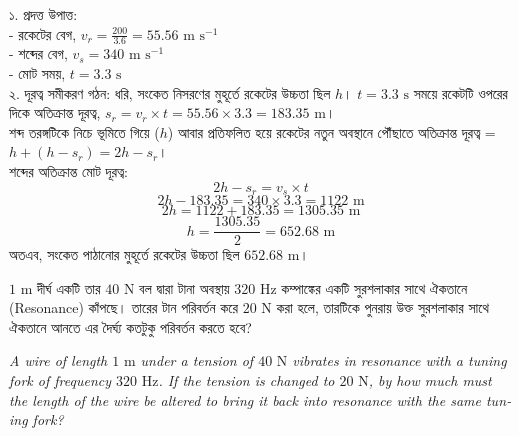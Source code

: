 \documentclass[12pt, a4paper]{article}
\begin{document}
\vspace{1em}
\begin{tcolorbox}[solutionbox={সমাধান (Solution)}]
\noindent
১. প্রদত্ত উপাত্ত: \\
- রকেটের বেগ, $v_r = \frac{200}{3.6} = 55.56\text{ m s}^{-1}$ \\
- শব্দের বেগ, $v_s = 340\text{ m s}^{-1}$ \\
- মোট সময়, $t = 3.3\text{ s}$ \\
২. দূরত্ব সমীকরণ গঠন: ধরি, সংকেত নিসরণের মুহূর্তে রকেটের উচ্চতা ছিল $h$। $t = 3.3\text{ s}$ সময়ে রকেটটি ওপরের দিকে অতিক্রান্ত দূরত্ব, $s_r = v_r \times t = 55.56 \times 3.3 = 183.35\text{ m}$। \\
শব্দ তরঙ্গটিকে নিচে ভূমিতে গিয়ে ($h$) আবার প্রতিফলিত হয়ে রকেটের নতুন অবস্থানে পৌঁছাতে অতিক্রান্ত দূরত্ব = $h + (h - s_r) = 2h - s_r$। \\
শব্দের অতিক্রান্ত মোট দূরত্ব:
\[ 2h - s_r = v_s \times t \]
\[ 2h - 183.35 = 340 \times 3.3 = 1122\text{ m} \]
\[ 2h = 1122 + 183.35 = 1305.35\text{ m} \]
\[ h = \frac{1305.35}{2} = 652.68\text{ m} \]
অতএব, সংকেত পাঠানোর মুহূর্তে রকেটের উচ্চতা ছিল $652.68\text{ m}$।
\end{tcolorbox}

\vspace{1.5em}

\begin{tcolorbox}[questionbox={প্রশ্ন (Question) 3}]
\noindent
$1\text{ m}$ দীর্ঘ একটি তার $40\text{ N}$ বল দ্বারা টানা অবস্থায় $320\text{ Hz}$ কম্পাঙ্কের একটি সুরশলাকার সাথে ঐকতানে (Resonance) কাঁপছে। তারের টান পরিবর্তন করে $20\text{ N}$ করা হলে, তারটিকে পুনরায় উক্ত সুরশলাকার সাথে ঐকতানে আনতে এর দৈর্ঘ্য কতটুকু পরিবর্তন করতে হবে?

\vspace{0.8em}
\begin{english}
\noindent\textit{\color{darkgray}
A wire of length $1\text{ m}$ under a tension of $40\text{ N}$ vibrates in resonance with a tuning fork of frequency $320\text{ Hz}$. If the tension is changed to $20\text{ N}$, by how much must the length of the wire be altered to bring it back into resonance with the same tuning fork?
}
\end{english}
\end{tcolorbox}
\end{document}
